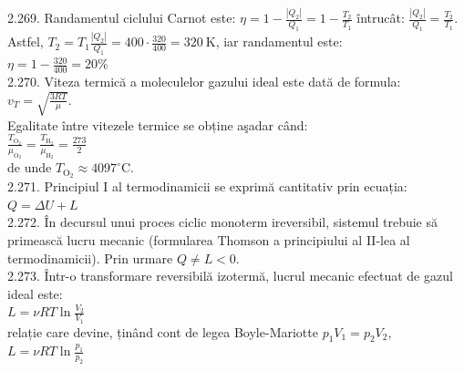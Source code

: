2.269. Randamentul ciclului Carnot este: $\eta=1-\frac{\left|Q_{2}\right|}{Q_{1}}=1-\frac{T_{2}}{T_{1}}$ întrucât: $\frac{\left|Q_{2}\right|}{Q_{1}}=\frac{T_{2}}{T_{1}}$. Astfel, $T_{2}=T_{1} \frac{\left|Q_{2}\right|}{Q_{1}}=400 \cdot \frac{320}{400}=320 \mathrm{~K}$, iar randamentul este:\\ $\eta=1-\frac{320}{400}=20 \%$\\

2.270. Viteza termică a moleculelor gazului ideal este dată de formula:\\ $v_{T}=\sqrt{\frac{3 R T}{\mu}}$.\\ Egalitate între vitezele termice se obține aşadar când:\\ $\frac{T_{\mathrm{O}_{2}}}{\mu_{\mathrm{O}_{2}}}=\frac{T_{\mathrm{H}_{2}}}{\mu_{\mathrm{H}_{2}}}=\frac{273}{2}$\\ de unde $T_{\mathrm{O}_{2}} \approx 4097^{\circ} \mathrm{C}$.\\

2.271. Principiul I al termodinamicii se exprimă cantitativ prin ecuația:\\ $Q=\Delta U+L$\\

2.272. În decursul unui proces ciclic monoterm ireversibil, sistemul trebuie să primească lucru mecanic (formularea Thomson a principiului al II-lea al termodinamicii). Prin urmare $Q \neq L<0$.\\

2.273. Într-o transformare reversibilă izotermă, lucrul mecanic efectuat de gazul ideal este:\\ $L=\nu R T \ln \frac{V_{2}}{V_{1}}$\\ relație care devine, ținând cont de legea Boyle-Mariotte $p_{1} V_{1}=p_{2} V_{2}$,\\ $L=\nu R T \ln \frac{p_{1}}{p_{2}}$\\

